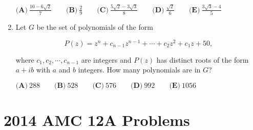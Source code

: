 \documentclass{article}
\begin{document}
\begin{enumerate}[label=\arabic*., itemsep=0.5em]
\(\textbf{(A)}\  \frac{10-6\sqrt{2}}{7} \qquad \textbf{(B)}\ \frac{2}{9} \qquad \textbf{(C)}\ \frac{5\sqrt{2}-3\sqrt{3}}{8} \qquad \textbf{(D)}\ \frac{\sqrt{2}}{6} \qquad \textbf{(E)}\ \frac{3\sqrt{3}-4}{5}\)\par \vspace{0.5em}\item Let \(G\) be the set of polynomials of the form

\begin{equation*}
P(z)=z^n+c_{n-1}z^{n-1}+\cdots+c_2z^2+c_1z+50,
\end{equation*}

where \( c_1,c_2,\cdots, c_{n-1} \) are integers and \(P(z)\) has distinct roots of the form \(a+ib\) with \(a\) and \(b\) integers. How many polynomials are in \(G\)?

\( \textbf{(A)}\ 288\qquad\textbf{(B)}\ 528\qquad\textbf{(C)}\ 576\qquad\textbf{(D)}\ 992\qquad\textbf{(E)}\ 1056 \)\par \vspace{0.5em}
\end{enumerate}
\newpage\section*{2014 AMC 12A Problems}
\end{document}
